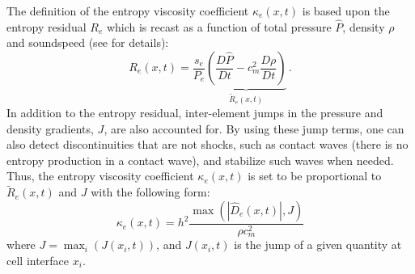 \documentclass[times,doublespace]{fldauth}%
\begin{document}
The definition of the entropy viscosity coefficient $\kappa_e(x,t)$ is based upon the entropy residual $R_e$ which is recast as a function of total pressure $\hat{P}$, density $\rho$ and soundspeed (see \cite{our_jcp_radhy_paper} for details):
%
\begin{equation}
\label{eq:equation9}
R_e(x,t) = \frac{s_e}{P_e} \underbrace{ \left( \frac{D\hat{P}}{Dt} - c_m^2 \frac{D\rho}{Dt} \right)}_\textrm{$\tilde{R}_e(x,t)$} \,.
\end{equation}
%
In addition to the entropy residual, inter-element jumps in the pressure and density gradients, $J$, are also accounted for. By using these jump terms, one can also detect discontinuities that are not shocks, such as contact waves (there is no entropy production in a contact wave), and stabilize such waves when needed. \\
Thus, the entropy viscosity coefficient $\kappa_e(x,t)$ is set to be proportional to $\tilde{R}_e(x,t)$ and $J$ with the following form: 
\begin{equation}
\label{eq:equation12}
\kappa_e(x,t) = h^2 \frac{\max (|\hat{D}_e(x,t)|, J)}{\rho c^2_m}
\end{equation} 
where $J = \max_i (J(x_i,t))$, and $J(x_i,t)$ is the jump of a given quantity at cell interface $x_i$. 
\end{document}
